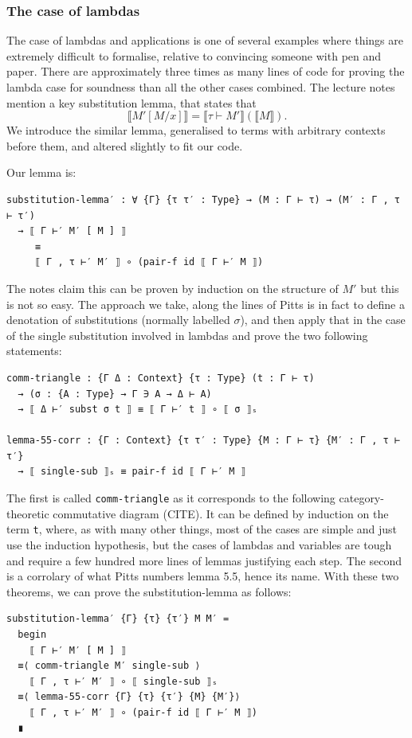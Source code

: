 \documentclass[12pt,a4paper,twoside,openright]{report}
\begin{document}
\subsubsection{The case of lambdas}
The case of lambdas and applications is one of several examples where things are extremely difficult to formalise, relative to convincing someone with pen and paper. There are approximately three times as many lines of code for proving the lambda case for soundness than all the other cases combined. The lecture notes mention a key substitution lemma, that states that
\[
\llbracket M' [M / x] \rrbracket = \llbracket \tau \vdash M' \rrbracket ( \llbracket M \rrbracket).
\]
We introduce the similar lemma, generalised to terms with arbitrary contexts before them, and altered slightly to fit our code. 

Our lemma is:
\begin{verbatim}
substitution-lemma′ : ∀ {Γ} {τ τ′ : Type} → (M : Γ ⊢ τ) → (M′ : Γ , τ ⊢ τ′)
  → ⟦ Γ ⊢′ M′ [ M ] ⟧
     ≡
     ⟦ Γ , τ ⊢′ M′ ⟧ ∘ (pair-f id ⟦ Γ ⊢′ M ⟧)
\end{verbatim}
The notes claim this can be proven by induction on the structure of $M'$ but this is not so easy. The approach we take, along the lines of Pitts \cite{Pitts} is in fact to define a denotation of substitutions (normally labelled $\sigma$), and then apply that in the case of the single substitution involved in lambdas and prove the two following statements:
\begin{verbatim}
comm-triangle : {Γ Δ : Context} {τ : Type} (t : Γ ⊢ τ) 
  → (σ : {A : Type} → Γ ∋ A → Δ ⊢ A)
  → ⟦ Δ ⊢′ subst σ t ⟧ ≡ ⟦ Γ ⊢′ t ⟧ ∘ ⟦ σ ⟧ₛ

lemma-55-corr : {Γ : Context} {τ τ′ : Type} {M : Γ ⊢ τ} {M′ : Γ , τ ⊢ τ′}
  → ⟦ single-sub ⟧ₛ ≡ pair-f id ⟦ Γ ⊢′ M ⟧
\end{verbatim}
The first is called \texttt{comm-triangle} as it corresponds to the following category-theoretic commutative diagram (CITE). It can be defined by induction on the term \texttt{t}, where, as with many other things, most of the cases are simple and just use the induction hypothesis, but the cases of lambdas and variables are tough and require a few hundred more lines of lemmas justifying each step. The second is a corrolary of what Pitts numbers lemma 5.5, hence its name. With these two theorems, we can prove the substitution-lemma as follows:
\begin{verbatim}
substitution-lemma′ {Γ} {τ} {τ′} M M′ =
  begin
    ⟦ Γ ⊢′ M′ [ M ] ⟧
  ≡⟨ comm-triangle M′ single-sub ⟩
    ⟦ Γ , τ ⊢′ M′ ⟧ ∘ ⟦ single-sub ⟧ₛ
  ≡⟨ lemma-55-corr {Γ} {τ} {τ′} {M} {M′}⟩
    ⟦ Γ , τ ⊢′ M′ ⟧ ∘ (pair-f id ⟦ Γ ⊢′ M ⟧)
  ∎
\end{verbatim}
\end{document}
